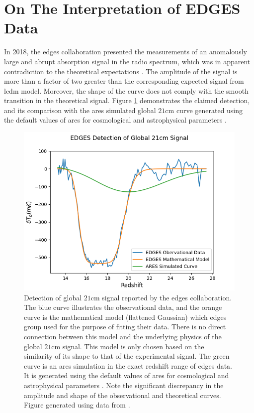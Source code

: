 \documentclass[12pt, TexShade, letterpaper]{report}
\begin{document}
\section{On The Interpretation of EDGES Data}
\label{chap:Observations,sub:edges_affair}
 In 2018, the \gls{edges} collaboration presented the measurements of an anomalously large and abrupt absorption signal in the radio spectrum, which was in apparent contradiction to the theoretical expectations \cite{edges}. The amplitude of the signal is more than a factor of two greater than the corresponding expected signal from \gls{lcdm} model. Moreover, the shape of the curve does not comply with the smooth transition in the theoretical signal. Figure \ref{fig:edges_data} demonstrates the claimed detection, and its comparison with the \gls{ares} simulated global $\mathrm{21cm}$ curve generated using the default values of \gls{ares} for cosmological and astrophysical parameters \cite{ares_documentation}.\par
\begin{figure}[h!]
    \centering
    \includegraphics[scale= 0.75]{edges_data.png}
    \caption[Results of \gls{edges} Experiment]{Detection of global $\mathrm{21cm}$ signal reported by the \gls{edges} collaboration. The blue curve illustrates the observational data, and the orange curve is the mathematical model (flattened Gaussian) which \gls{edges} group used for the purpose of fitting their data. There is no direct connection between this model and the underlying physics of the global $\mathrm{21cm}$ signal. This model is only chosen based on the similarity of its shape to that of the experimental signal. The green curve is an \gls{ares} simulation in the exact redshift range of \gls{edges} data. It is generated using the default values of \gls{ares} for cosmological and astrophysical parameters \cite{ares_documentation}. Note the significant discrepancy in the amplitude and shape of the observational and theoretical curves. Figure generated using data from \cite{edges}.}
    \label{fig:edges_data}
\end{figure}
 
\end{document}
